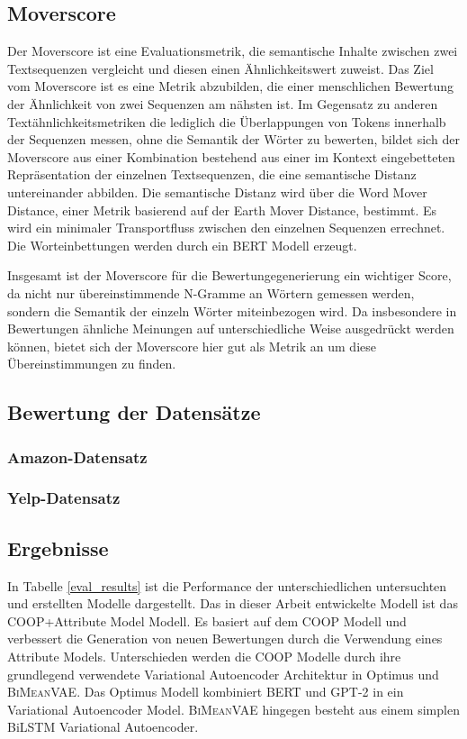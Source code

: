 \subsection{Moverscore}
\label{moverscore}
Der Moverscore \citep{moverscore_paper} ist eine Evaluationsmetrik, die semantische Inhalte zwischen zwei Textsequenzen vergleicht und diesen einen Ähnlichkeitswert zuweist.
Das Ziel vom Moverscore ist es eine Metrik abzubilden, die einer menschlichen Bewertung der Ähnlichkeit von zwei Sequenzen am nähsten ist. 
Im Gegensatz zu anderen Textähnlichkeitsmetriken die lediglich die Überlappungen von Tokens innerhalb der Sequenzen messen, ohne die Semantik der Wörter zu bewerten, 
bildet sich der Moverscore aus einer Kombination bestehend aus einer im Kontext eingebetteten Repräsentation der einzelnen Textsequenzen, die eine semantische Distanz untereinander abbilden.
Die semantische Distanz wird über die Word Mover Distance, einer Metrik basierend auf der Earth Mover Distance, bestimmt. Es wird ein minimaler Transportfluss zwischen den einzelnen Sequenzen errechnet.
Die Worteinbettungen werden durch ein BERT Modell erzeugt.

Insgesamt ist der Moverscore für die Bewertungegenerierung ein wichtiger Score, da nicht nur übereinstimmende N-Gramme an Wörtern gemessen werden, sondern die Semantik der einzeln Wörter miteinbezogen wird. 
Da insbesondere in Bewertungen ähnliche Meinungen auf unterschiedliche Weise ausgedrückt werden können, bietet sich der Moverscore hier gut als Metrik an um diese Übereinstimmungen zu finden.


\subsection{Bewertung der Datensätze}

\subsubsection{Amazon-Datensatz}

\subsubsection{Yelp-Datensatz}

\subsection{Ergebnisse}
In Tabelle \ref{eval_results} ist die Performance der unterschiedlichen untersuchten und erstellten Modelle dargestellt.
Das in dieser Arbeit entwickelte Modell ist das \glqq COOP+Attribute Model\grqq{} Modell.
Es basiert auf dem COOP Modell und verbessert die Generation von neuen Bewertungen durch die Verwendung eines Attribute Models.
Unterschieden werden die COOP Modelle durch ihre grundlegend verwendete Variational Autoencoder Architektur in Optimus und \textsc{BiMeanVAE}.
Das Optimus Modell kombiniert BERT und GPT-2 in ein Variational Autoencoder Model. \textsc{BiMeanVAE} hingegen besteht aus einem simplen BiLSTM Variational Autoencoder.

